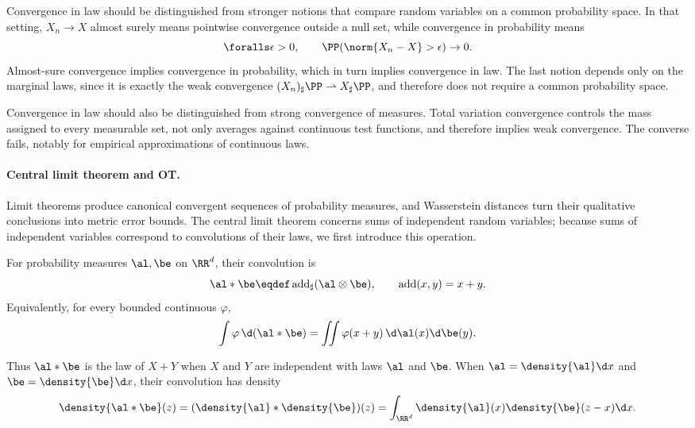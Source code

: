 Convergence in law should be distinguished from stronger notions that compare random variables on a common probability space. In that setting, $X_n\to X$ almost surely means pointwise convergence outside a null set, while convergence in probability means
\[
	\foralls \epsilon>0,\qquad
	\PP(\norm{X_n-X}>\epsilon)\to0.
\]
Almost-sure convergence implies convergence in probability, which in turn implies convergence in law. The last notion depends only on the marginal laws, since it is exactly the weak convergence $(X_n)_\sharp\PP\rightharpoonup X_\sharp\PP$, and therefore does not require a common probability space.

Convergence in law should also be distinguished from strong convergence of measures. Total variation convergence controls the mass assigned to every measurable set, not only averages against continuous test functions, and therefore implies weak convergence. The converse fails, notably for empirical approximations of continuous laws.

\paragraph{Central limit theorem and OT.}

Limit theorems produce canonical convergent sequences of probability measures, and Wasserstein distances turn their qualitative conclusions into metric error bounds. The central limit theorem concerns sums of independent random variables; because sums of independent variables correspond to convolutions of their laws, we first introduce this operation.
\begin{defn}\label{def-measure-convolution}
	For probability measures $\al,\be$ on $\RR^d$, their convolution is
	\[
		\al*\be\eqdef\operatorname{add}_\sharp(\al\otimes\be),
		\qquad \operatorname{add}(x,y)=x+y.
	\]
	Equivalently, for every bounded continuous $\varphi$,
	\[
		\int\varphi\,\d(\al*\be)
		=
		\iint\varphi(x+y)\,\d\al(x)\d\be(y).
	\]
\end{defn}
Thus $\al*\be$ is the law of $X+Y$ when $X$ and $Y$ are independent with laws $\al$ and $\be$. When $\al=\density{\al}\d x$ and $\be=\density{\be}\d x$, their convolution has density
\[
	\density{\al*\be}(z)
	=
	(\density{\al}*\density{\be})(z)
	=
	\int_{\RR^d}\density{\al}(x)\density{\be}(z-x)\d x.
\]

